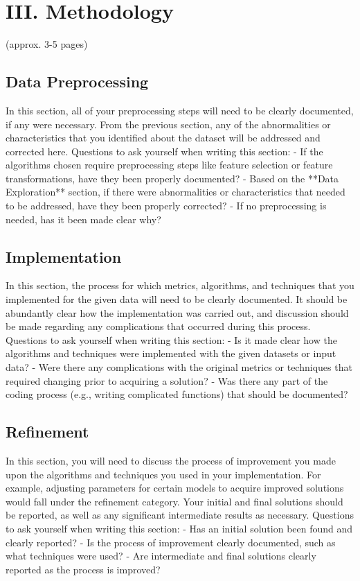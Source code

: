 \documentclass[12pt]{article}
\begin{document}
\section{III. Methodology}
(approx. 3-5 pages)

\subsection{Data Preprocessing}
In this section, all of your preprocessing steps will need to be clearly documented, if any were necessary. From the previous section, any of the abnormalities or characteristics that you identified about the dataset will be addressed and corrected here. Questions to ask yourself when writing this section:
- If the algorithms chosen require preprocessing steps like feature selection or feature transformations, have they been properly documented?
- Based on the **Data Exploration** section, if there were abnormalities or characteristics that needed to be addressed, have they been properly corrected?
- If no preprocessing is needed, has it been made clear why?

\subsection{Implementation}
In this section, the process for which metrics, algorithms, and techniques that you implemented for the given data will need to be clearly documented. It should be abundantly clear how the implementation was carried out, and discussion should be made regarding any complications that occurred during this process. Questions to ask yourself when writing this section:
- Is it made clear how the algorithms and techniques were implemented with the given datasets or input data?
- Were there any complications with the original metrics or techniques that required changing prior to acquiring a solution?
- Was there any part of the coding process (e.g., writing complicated functions) that should be documented?

\subsection{Refinement}
In this section, you will need to discuss the process of improvement you made upon the algorithms and techniques you used in your implementation. For example, adjusting parameters for certain models to acquire improved solutions would fall under the refinement category. Your initial and final solutions should be reported, as well as any significant intermediate results as necessary. Questions to ask yourself when writing this section:
- Has an initial solution been found and clearly reported?
- Is the process of improvement clearly documented, such as what techniques were used?
- Are intermediate and final solutions clearly reported as the process is improved?
\end{document}
